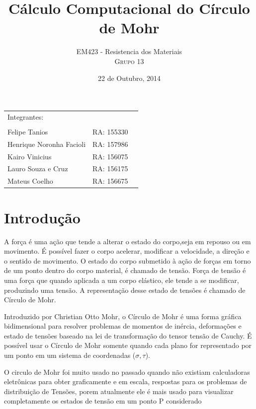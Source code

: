 \documentclass[a4paper]{article}
\title{Cálculo Computacional do Círculo de Mohr} %
\author{EM423 - Resistencia dos Materiais \\ \textsc{Grupo 13}}
\date{22 de Outubro, 2014}
\begin{document}
\maketitle

\begin{center}

	\begin{tabular}{l r l}
		Integrantes:\\\\
		 Felipe Tanios & RA: 155330  \\
		 Henrique Noronha Facioli & RA: 157986 \\
		 Kairo Vinicius & RA: 156075 \\
		 Lauro Souza e Cruz & RA: 156175\\
		 Mateus Coelho & RA: 156675 \\
	\end{tabular}
\end{center}


\newpage

\section{Introdução}


A força é uma ação que tende a alterar o estado do corpo,seja em repouso ou em movimento. É possível fazer o corpo acelerar, modificar a velocidade, a direção e o sentido de movimento. 
O estado do corpo submetido à ação de forças em torno de um ponto dentro do corpo material, é chamado de tensão. Força de tensão é uma força que quando aplicada a um corpo elástico, ele tende a se modificar, produzindo uma tensão. A representação desse estado de tensões é chamado de Círculo de Mohr.

Introduzido por  Christian Otto Mohr,  o Círculo de Mohr é uma forma gráfica bidimensional para resolver problemas de momentos de inércia, deformações e estado de tensões baseado na lei de transformação do tensor tensão de Cauchy. É possível usar o Círculo de Mohr somente quando cada plano for representado por um ponto em um sistema de coordenadas ($\sigma,\tau$).

O circulo de Mohr foi muito usado no passado quando não existiam calculadoras eletrônicas para obter graficamente e em escala, respostas para os problemas de distribuição de Tensões, porem atualmente ele é mais usado para visualizar completamente os estados de tensão em um ponto P considerado
\end{document}
